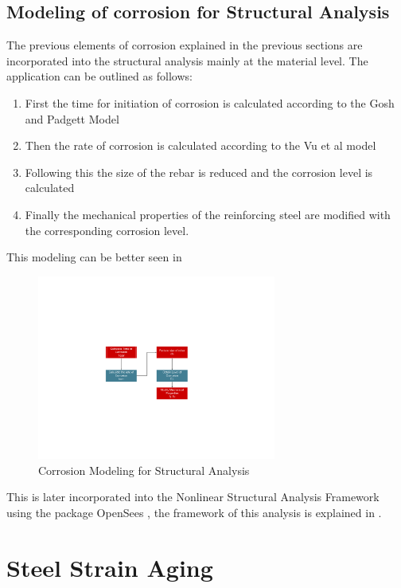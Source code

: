 \subsection{Modeling of corrosion for Structural Analysis}

The previous elements of corrosion explained in the previous sections are incorporated into the structural analysis mainly at the material level. The application can be outlined as follows:
\begin{enumerate}
	\item First the time for initiation of corrosion is calculated according to the Gosh and Padgett Model \cite{Ghosh2010}
	\item Then the rate of corrosion is calculated according to the Vu et al model \cite{Vu2000}
	\item Following this the size of the rebar is reduced and the corrosion level is calculated
	\item Finally the mechanical properties of the reinforcing steel are modified with the corresponding corrosion level.
\end{enumerate}

This modeling can be better seen in 

\begin{figure}[htbp]
	\centering
	\includegraphics[width=0.7\textwidth]{Chapter-4/figs/Corrosion_Modeling}
	\caption{Corrosion Modeling for Structural Analysis}
	\label{fig:CorrModel}
\end{figure}

This is later incorporated into the Nonlinear Structural Analysis Framework using the package OpenSees \cite{McKenna2010}, the framework of this analysis is explained in \cite{Chapter-5}.

\section{Steel Strain Aging}

